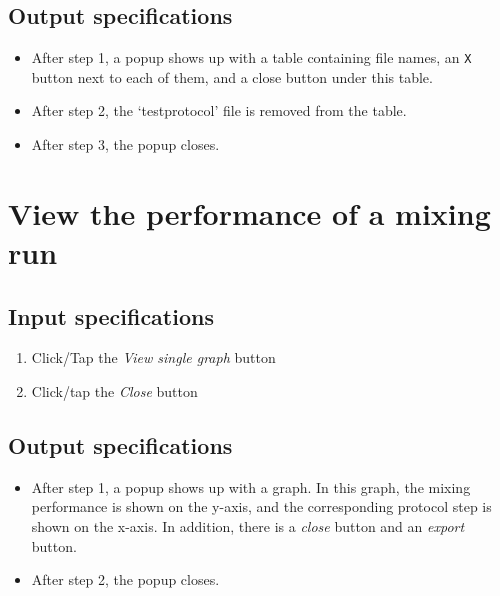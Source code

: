 \subsection*{Output specifications}
\begin{itemize}
\item After step 1, a popup shows up with a table containing file names, an \texttt{X} button next to each of them, and a close button under this table.
\item After step 2, the `testprotocol' file is removed from the table.
\item After step 3, the popup closes.
\end{itemize}

\section{View the performance of a mixing run}

\subsection*{Input specifications}
\begin{enumerate}
\item Click/Tap the \emph{View single graph} button
\item Click/tap the \emph{Close} button
\end{enumerate}

\subsection*{Output specifications}
\begin{itemize}
\item After step 1, a popup shows up with a graph. In this graph, the mixing performance is shown on the y-axis, and the corresponding protocol step is shown on the x-axis. In addition, there is a \emph{close} button and an \emph{export} button.
\item After step 2, the popup closes.
\end{itemize}

